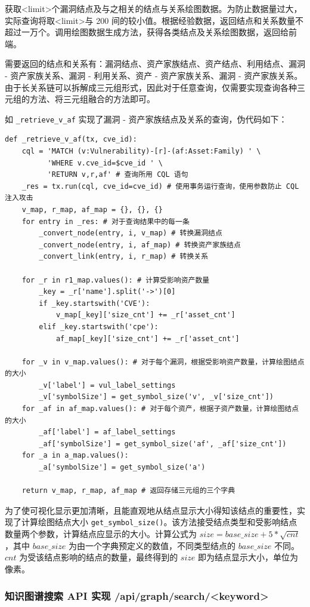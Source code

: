 \documentclass[a4paper,AutoFakeBold,oneside,12pt]{book}
\begin{document}
获取<limit>个漏洞结点及与之相关的结点与关系绘图数据。为防止数据量过大，实际查询将取<limit>与 200 间的较小值。根据经验数据，返回结点和关系数量不超过一万个。调用绘图数据生成方法，获得各类结点及关系绘图数据，返回给前端。

需要返回的结点和关系有：漏洞结点、资产家族结点、资产结点、利用结点、漏洞 - 资产家族关系、漏洞 - 利用关系、资产 - 资产家族关系、漏洞 - 资产家族关系。由于长关系链可以拆解成三元组形式，因此对于任意查询，仅需要实现查询各种三元组的方法、将三元组融合的方法即可。

如 \lstinline|_retrieve_v_af| 实现了漏洞 - 资产家族结点及关系的查询，伪代码如下：
\begin{lstlisting}[style=lgeneral]
def _retrieve_v_af(tx, cve_id):
	cql = 'MATCH (v:Vulnerability)-[r]-(af:Asset:Family) ' \
	      'WHERE v.cve_id=$cve_id ' \
	      'RETURN v,r,af' # 查询所用 CQL 语句
	_res = tx.run(cql, cve_id=cve_id) # 使用事务运行查询，使用参数防止 CQL 注入攻击
	v_map, r_map, af_map = {}, {}, {}
	for entry in _res: # 对于查询结果中的每一条
		_convert_node(entry, i, v_map) # 转换漏洞结点
		_convert_node(entry, i, af_map) # 转换资产家族结点
		_convert_link(entry, i, r_map) # 转换关系

	for _r in r1_map.values(): # 计算受影响资产数量
		_key = _r['name'].split('->')[0]
		if _key.startswith('CVE'):
			v_map[_key]['size_cnt'] += _r['asset_cnt']
		elif _key.startswith('cpe'):
			af_map[_key]['size_cnt'] += _r['asset_cnt']
	
	for _v in v_map.values(): # 对于每个漏洞，根据受影响资产数量，计算绘图结点的大小
		_v['label'] = vul_label_settings
		_v['symbolSize'] = get_symbol_size('v', _v['size_cnt'])
	for _af in af_map.values(): # 对于每个资产，根据子资产数量，计算绘图结点的大小
		_af['label'] = af_label_settings
		_af['symbolSize'] = get_symbol_size('af', _af['size_cnt'])
	for _a in a_map.values():
		_a['symbolSize'] = get_symbol_size('a')

	return v_map, r_map, af_map # 返回存储三元组的三个字典
\end{lstlisting}

为了使可视化显示更加清晰，且能直观地从结点显示大小得知该结点的重要性，实现了计算绘图结点大小 \lstinline|get_symbol_size()|。该方法接受结点类型和受影响结点数量两个参数，计算结点应显示的大小。计算公式为 $size=base{\_}size+5*\sqrt{cnt}$，其中 $base{\_}size$ 为由一个字典预定义的数值，不同类型结点的 $base{\_}size$ 不同。$cnt$ 为受该结点影响的结点的数量，最终得到的 $size$ 即为结点显示大小，单位为像素。


\subsubsection{知识图谱搜索 API 实现 /api/graph/search/<keyword>}
\end{document}
